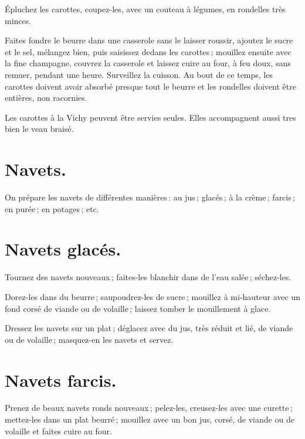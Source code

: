 Épluchez les carottes, coupez-les, avec un couteau à légumes, en rondelles très
minces.

Faites fondre le beurre dans une casserole sans le laisser roussir, ajoutez le
sucre et le sel, mélangez bien, puis saisissez dedans les carottes ; mouillez ensuite
avec la fine champagne, couvrez la casserole et laissez cuire au four, à feu doux,
sans remuer, pendant une heure. Surveillez la cuisson. Au bout de ce temps, les
carottes doivent avoir absorbé presque tout le beurre et les rondelles doivent
être entières, non racornies.

\medskip

Les carottes à la Vichy peuvent être servies seules. Elles accompagnent aussi
tres bien le veau braisé.

\section*{\centering Navets.}
{}

On prépare les navets de différentes manières :
au jus ;
glacés ;
à la crème ;
farcis ;
en purée ;
en potages ; etc.

\section*{\centering Navets glacés.}
{}

Tournez des navets nouveaux ; faites-les blanchir dans de l'eau salée ;
séchez-les.

Dorez-les dans du beurre ; saupoudrez-les de sucre ; mouillez à mi-hauteur avec
un fond corsé de viande ou de volaille ; laissez tomber le mouillement à glace.

Dressez les navets sur un plat ; déglacez avec du jus, très réduit et lié, de
viande ou de volaille ; masquez-en les navets et servez.

\section*{\centering Navets farcis.}
{}

Prenez de beaux navets ronds nouveaux ; pelez-les, creusez-les avec une curette ;
mettez-les dans un plat beurré ; mouillez avec un bon jus, corsé, de viande ou de
volaille et faites cuire au four.

